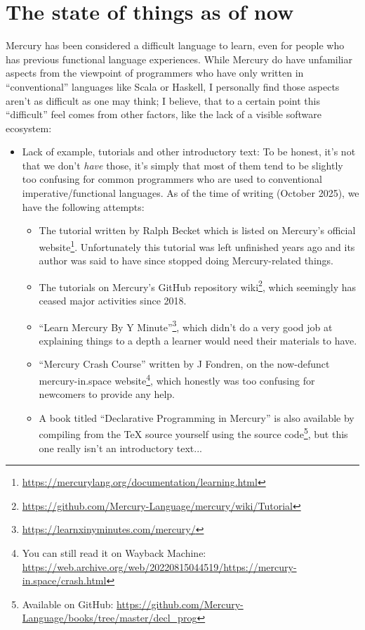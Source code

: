 \section{The state of things as of now}

Mercury has been considered a difficult language to learn, even for people who has previous functional language experiences. While Mercury do have unfamiliar aspects from the viewpoint of programmers who have only written in ``conventional'' languages like Scala or Haskell, I personally find those aspects aren't as difficult as one may think; I believe, that to a certain point this ``difficult'' feel comes from other factors, like the lack of a visible software ecosystem:

\begin{itemize}
\item Lack of example, tutorials and other introductory text: To be honest, it's not that we don't \textit{have} those, it's simply that most of them tend to be slightly too confusing for common programmers who are used to conventional imperative/functional languages. As of the time of writing (October 2025), we have the following attempts:
  \begin{itemize}
  \item The tutorial written by Ralph Becket which is listed on Mercury's official website\footnote{\url{https://mercurylang.org/documentation/learning.html}}. Unfortunately this tutorial was left unfinished years ago and its author was said to have since stopped doing Mercury-related things.
    \item The tutorials on Mercury's GitHub repository wiki\footnote{\url{https://github.com/Mercury-Language/mercury/wiki/Tutorial}}, which seemingly has ceased major activities since 2018.
    \item ``Learn Mercury By Y Minute''\footnote{\url{https://learnxinyminutes.com/mercury/}}, which didn't do a very good job at explaining things to a depth a learner would need their materials to have.
    \item ``Mercury Crash Course'' written by J Fondren, on the now-defunct mercury-in.space website\footnote{You can still read it on Wayback Machine: \url{https://web.archive.org/web/20220815044519/https://mercury-in.space/crash.html}}, which honestly was too confusing for newcomers to provide any help.
      \item A book titled ``Declarative Programming in Mercury'' is also available by compiling from the TeX source yourself using the source code\footnote{Available on GitHub: \url{https://github.com/Mercury-Language/books/tree/master/decl_prog}}, but this one really isn't an introductory text...

\end{itemize}
\end{itemize}
